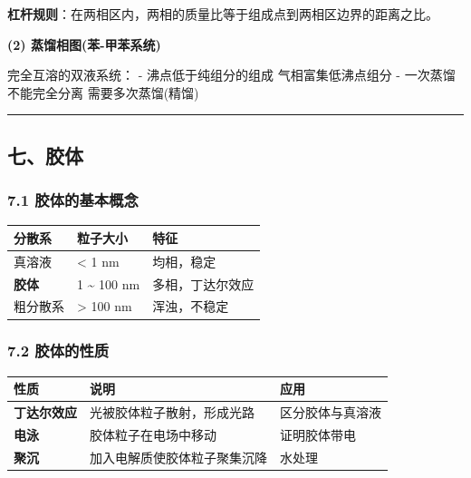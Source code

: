 \textbf{杠杆规则}：在两相区内，两相的质量比等于组成点到两相区边界的距离之比。

\textbf{(2) 蒸馏相图(苯-甲苯系统)}

完全互溶的双液系统：
- 沸点低于纯组分的组成 \箭 气相富集低沸点组分
- 一次蒸馏不能完全分离 \箭 需要多次蒸馏(精馏)

\begin{center}\rule{0.5\linewidth}{0.5pt}\end{center}

\subsection{七、胶体}\label{ux4e03ux80f6ux4f53}

\subsubsection{7.1 胶体的基本概念}\label{ux80f6ux4f53ux7684ux57faux672cux6982ux5ff5}

{\def\LTcaptype{none} %
\begin{longtable}[]{@{}lll@{}}
\toprule\noalign{}
分散系 & 粒子大小 & 特征 \\
\midrule\noalign{}
\endhead
\bottomrule\noalign{}
\endlastfoot
真溶液 & \textless{} 1 nm & 均相，稳定 \\
\textbf{胶体} & 1 \textasciitilde{} 100 nm & 多相，丁达尔效应 \\
粗分散系 & \textgreater{} 100 nm & 浑浊，不稳定 \\
\end{longtable}
}

\subsubsection{7.2 胶体的性质}\label{ux80f6ux4f53ux7684ux6027ux8d28}

{\def\LTcaptype{none} %
\begin{longtable}[]{@{}lll@{}}
\toprule\noalign{}
性质 & 说明 & 应用 \\
\midrule\noalign{}
\endhead
\bottomrule\noalign{}
\endlastfoot
\textbf{丁达尔效应} & 光被胶体粒子散射，形成光路 & 区分胶体与真溶液 \\
\textbf{电泳} & 胶体粒子在电场中移动 & 证明胶体带电 \\
\textbf{聚沉} & 加入电解质使胶体粒子聚集沉降 & 水处理 \\
\end{longtable}
}

